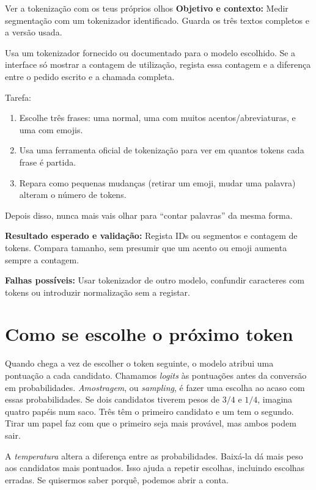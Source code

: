 \begin{promptlabbox}{Ver a tokenização com os teus próprios olhos}
\textbf{Objetivo e contexto:} Medir segmentação com um tokenizador identificado. Guarda os três textos completos e a versão usada.

Usa um tokenizador fornecido ou documentado para o modelo escolhido. Se a interface só mostrar a contagem de utilização, regista essa contagem e a diferença entre o pedido escrito e a chamada completa.

\medskip

Tarefa:

\begin{enumerate}[leftmargin=*]
\item Escolhe três frases: uma normal, uma com muitos acentos/abreviaturas, e uma com emojis.
\item Usa uma ferramenta oficial de tokenização para ver em quantos tokens cada frase é partida.
\item Repara como pequenas mudanças (retirar um emoji, mudar uma palavra) alteram o número de tokens.
\end{enumerate}

Depois disso, nunca mais vais olhar para “contar palavras” da mesma forma.

\textbf{Resultado esperado e validação:} Regista IDs ou segmentos e contagem de tokens. Compara tamanho, sem presumir que um acento ou emoji aumenta sempre a contagem.

\textbf{Falhas possíveis:} Usar tokenizador de outro modelo, confundir caracteres com tokens ou introduzir normalização sem a registar.
\end{promptlabbox}

\section{Como se escolhe o próximo token}
Quando chega a vez de escolher o token seguinte, o modelo atribui uma pontuação a cada candidato. Chamamos \emph{logits} às pontuações antes da conversão em probabilidades. \emph{Amostragem}, ou \emph{sampling}, é fazer uma escolha ao acaso com essas probabilidades. Se dois candidatos tiverem pesos de $3/4$ e $1/4$, imagina quatro papéis num saco. Três têm o primeiro candidato e um tem o segundo. Tirar um papel faz com que o primeiro seja mais provável, mas ambos podem sair.

A \emph{temperatura} altera a diferença entre as probabilidades. Baixá-la dá mais peso aos candidatos mais pontuados. Isso ajuda a repetir escolhas, incluindo escolhas erradas. Se quisermos saber porquê, podemos abrir a conta.

